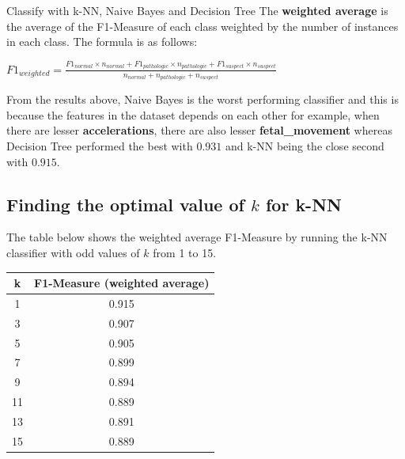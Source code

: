 \documentclass[12pt]{article}
\begin{document}
\begin{section}{Classify with k-NN, Naive Bayes and Decision Tree}
 The \textbf{weighted average} is the average of the F1-Measure of each class weighted by the number of instances in each class.
 The formula is as follows:

 \begin{center}
     $F1_{weighted} = \frac{F1_{normal} \times n_{normal} + F1_{pathologic} \times n_{pathologic} + F1_{suspect} \times n_{suspect}}{n_{normal} + n_{pathologic} + n_{suspect}}$
 \end{center}

 From the results above, Naive Bayes is the worst performing classifier and this is because
 the features in the dataset depends on each other for example, when there are lesser
 \textbf{accelerations}, there are also lesser \textbf{fetal\_movement} whereas Decision Tree
 performed the best with $0.931$ and k-NN being the close second with $0.915$.

 \subsection{Finding the optimal value of $k$ for k-NN}
 The table below shows the weighted average F1-Measure by running the k-NN classifier with odd values of $k$ from 1 to 15.

 \begin{center}
     \begin{tabular}{| c | c |}
         \hline
         \textbf{k} & \textbf{F1-Measure (weighted average)} \\ [0.5ex]
         \hline
         1          & 0.915                                  \\
         \hline
         3          & 0.907                                  \\
         \hline
         5          & 0.905                                  \\
         \hline
         7          & 0.899                                  \\
         \hline
         9          & 0.894                                  \\
         \hline
         11         & 0.889                                  \\
         \hline
         13         & 0.891                                  \\
         \hline
         15         & 0.889                                  \\
         \hline
     \end{tabular}
 \end{center}


\end{section}
\end{document}
